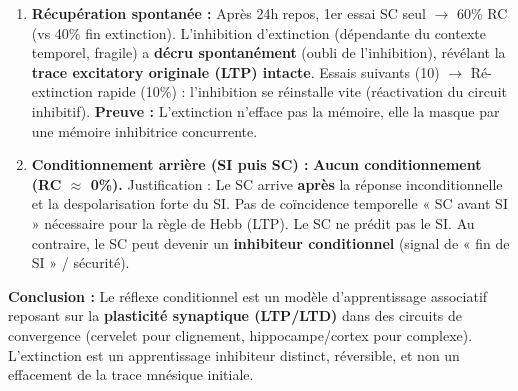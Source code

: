 \documentclass[11pt]{article}
\begin{document}
\begin{exoresolu}
\begin{enumerate}
    \item \textbf{Récupération spontanée :} Après 24h repos, 1er essai SC seul $\rightarrow$ 60\% RC (vs 40\% fin extinction). L'inhibition d'extinction (dépendante du contexte temporel, fragile) a \textbf{décru spontanément} (oubli de l'inhibition), révélant la \textbf{trace excitatory originale (LTP) intacte}. Essais suivants (10) $\rightarrow$ Ré-extinction rapide (10\%) : l'inhibition se réinstalle vite (réactivation du circuit inhibitif). \textbf{Preuve :} L'extinction n'efface pas la mémoire, elle la masque par une mémoire inhibitrice concurrente.
    \item \textbf{Conditionnement arrière (SI puis SC) :} \textbf{Aucun conditionnement (RC $\approx$ 0\%).} Justification : Le SC arrive \textbf{après} la réponse inconditionnelle et la despolarisation forte du SI. Pas de coïncidence temporelle « SC avant SI » nécessaire pour la règle de Hebb (LTP). Le SC ne prédit pas le SI. Au contraire, le SC peut devenir un \textbf{inhibiteur conditionnel} (signal de « fin de SI » / sécurité).
\end{enumerate}
\textbf{Conclusion :} Le réflexe conditionnel est un modèle d'apprentissage associatif reposant sur la \textbf{plasticité synaptique (LTP/LTD)} dans des circuits de convergence (cervelet pour clignement, hippocampe/cortex pour complexe). L'extinction est un apprentissage inhibiteur distinct, réversible, et non un effacement de la trace mnésique initiale.
\end{exoresolu}
\end{document}
